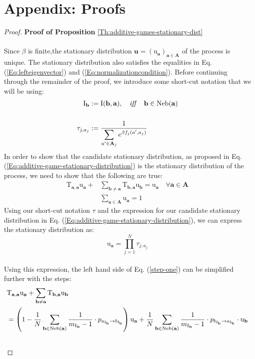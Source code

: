 \documentclass[11pt]{article}
\theoremstyle{plainCl1}
\theoremstyle{plainCl2}
\newcommand{\A}{\mathbf{A}}
\newcommand{\abf}{\mathbf{a}}
\newcommand{\bbf}{\mathbf{b}}
\newcommand{\ubf}{\mathbf{u}}
\begin{document}
\section*{Appendix: Proofs}
\label{Section:Appendix}
\begin{proof}
\textbf{Proof of Proposition} \ref{Th:additive-games-stationary-dist} \\ \\ 
Since $\beta$ is finite,the stationary distribution $\ubf = (\mathrm{u}_\abf)_{\abf \in \A}$ of the process is unique. The stationary distribution also satisfies the equalities in Eq. (\ref{Eq:lefteigenvector}) and (\ref{Eq:normalizationcondition}). Before continuing through the remainder of the proof, we introduce some short-cut notation that we will be using:\\
\begin{align}
\mathrm{I}_{\bbf} &:= \mathrm{I}(\bbf,\abf), \quad \mathit{iff} \quad \bbf \in \mathrm{Neb}(\abf) \\ \notag \\ 
\label{Eq:shortcut-tau}
\tau_{j,a_j} &:= \frac{1}{\displaystyle \sum_{a' \in \A_j} e^{\beta f_j(a',  a_j)}} 
\end{align}
\noindent In order to show that the candidate stationary distribution, as proposed in Eq. (\ref{Eq:additive-game-stationary-distribution}) is the stationary distribution of the process, we need to show that the following are true:
\begin{align}
\label{step-one}
\mathrm{T}_{\abf,\abf} \mathrm{u}_\abf  + &\sum_{\bbf \neq \abf} \mathrm{T}_{\bbf, \abf} \mathrm{u}_{\bbf} = \mathrm{u}_\abf \quad \forall \abf \in \A \\[10pt]
\label{step-two}
&\sum_{\abf \in \A} \mathrm{u}_\abf  = 1
\end{align} 
Using our short-cut notation $\tau$ and the expression for our candidate stationary distribution in Eq. (\ref{Eq:additive-game-stationary-distribution}), we can express the stationary distribution as: 
\begin{equation}
\mathrm{u}_\abf = \prod_{j=1}^N \tau_{j,a_j}
\label{Eq:additive-stat-shortcut}
\end{equation} \\ 
Using this expression, the left hand side of Eq. (\ref{step-one}) can be simplified further with the steps: 
\begin{align}
&\mathrm{T}_{\abf,\abf} \mathrm{u}_\abf  + \sum_{\bbf \neq \abf} \mathrm{T}_{\bbf, \abf} \mathrm{u}_{\bbf}\\
&= \left( 1 - \frac{1}{N} \sum_{\bbf \in \mathrm{Neb}(\abf)} \frac{1}{m_{\mathrm{I}_\bbf}-1} \cdot p_{a_{\mathrm{I}_\bbf} \to b_{\mathrm{I}_\bbf}} \right) \mathrm{u}_{\abf}+ \frac{1}{N}\sum_{\bbf \in \mathrm{Neb}(\abf)}  \frac{1}{m_{\mathrm{I}_\bbf}-1} \cdot p_{b_{\mathrm{I}_\bbf} \to a_{\mathrm{I}_\bbf}} \cdot \mathrm{u}_{\bbf}\\ \notag \\

\end{align}
\end{proof}
\end{document}
